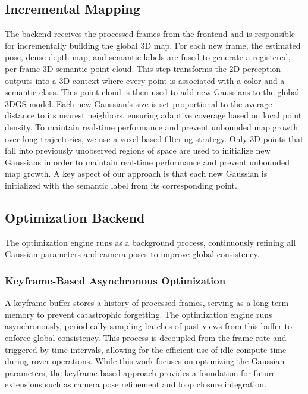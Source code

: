 \subsection{Incremental Mapping}
The backend receives the processed frames from the frontend and is responsible for incrementally building the global 3D map. For each new frame, the estimated pose, dense depth map, and semantic labels are fused to generate a registered, per-frame 3D semantic point cloud. This step transforms the 2D perception outputs into a 3D context where every point is associated with a color and a semantic class. This point cloud is then used to add new Gaussians to the global 3DGS model.
Each new Gaussian's size is set proportional to the average distance to its nearest neighbors, ensuring adaptive coverage based on local point density.
To maintain real-time performance and prevent unbounded map growth over long trajectories, we use a voxel-based filtering strategy. Only 3D points that fall into previously unobserved regions of space are used to initialize new Gaussians in order to maintain real-time performance and prevent unbounded map growth. A key aspect of our approach is that each new Gaussian is initialized with the semantic label from its corresponding point.

\subsection{Optimization Backend}
The optimization engine runs as a background process, continuously refining all Gaussian parameters and camera poses to improve global consistency.

\subsubsection{Keyframe-Based Asynchronous Optimization}
A keyframe buffer stores a history of processed frames, serving as a long-term memory to prevent catastrophic forgetting. The optimization engine runs asynchronously, periodically sampling batches of past views from this buffer to enforce global consistency. This process is decoupled from the frame rate and triggered by time intervals, allowing for the efficient use of idle compute time during rover operations. While this work focuses on optimizing the Gaussian parameters, the keyframe-based approach provides a foundation for future extensions such as camera pose refinement and loop closure integration.

